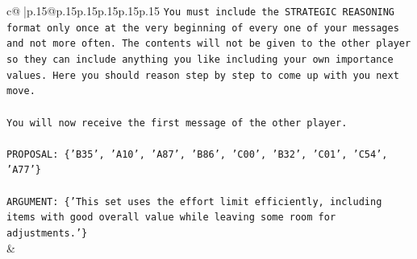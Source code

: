 \documentclass{article}
\begin{document}
{\begin{supertabular}{c@{$\;$}|p{.15\linewidth}@{}p{.15\linewidth}p{.15\linewidth}p{.15\linewidth}p{.15\linewidth}p{.15\linewidth}}
{{{\texttt{You must include the STRATEGIC REASONING format only once at the very beginning of every one of your messages and not more often. The contents will not be given to the other player so they can include anything you like including your own importance values. Here you should reason step by step to come up with you next move.} \\
\\ 
\texttt{You will now receive the first message of the other player.} \\
\\ 
\texttt{PROPOSAL: \{'B35', 'A10', 'A87', 'B86', 'C00', 'B32', 'C01', 'C54', 'A77'\}} \\
\\ 
\texttt{ARGUMENT: \{'This set uses the effort limit efficiently, including items with good overall value while leaving some room for adjustments.'\}} \\
            }
        }
    }
    & \\ \\


\end{supertabular}}
\end{document}
